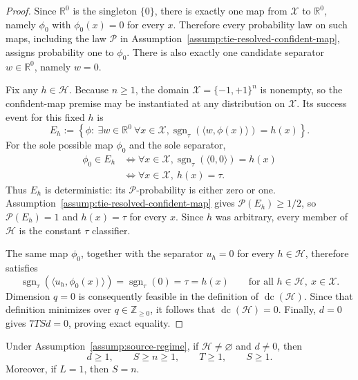 \begin{proof}
Since $\mathbb R^0$ is the singleton $\{0\}$, there is exactly one map
from $\mathcal X$ to $\mathbb R^0$, namely $\phi_0$ with
$\phi_0(x)=0$ for every $x$.  Therefore every probability law on such maps,
including the law $\mathcal P$ in Assumption~\ref{assump:tie-resolved-confident-map},
assigns probability one to $\phi_0$.  There is also exactly one candidate
separator $w\in\mathbb R^0$, namely $w=0$.

Fix any $h\in\mathcal H$.  Because $n\geq 1$, the domain
$\mathcal X=\{-1,+1\}^n$ is nonempty, so the confident-map premise may be
instantiated at any distribution on $\mathcal X$.  Its success event for this
fixed $h$ is
\[
E_h:=\left\{\phi:\ \exists w\in\mathbb R^0\ \forall x\in\mathcal X,
\operatorname{sgn}_{\tau}(\langle w,\phi(x)\rangle)=h(x)\right\}.
\]
For the sole possible map $\phi_0$ and the sole separator,
\[
\begin{aligned}
\phi_0\in E_h
&\iff \forall x\in\mathcal X,
\operatorname{sgn}_{\tau}(\langle 0,0\rangle)=h(x)\\
&\iff \forall x\in\mathcal X,\ h(x)=\tau.
\end{aligned}
\]
Thus $E_h$ is deterministic: its $\mathcal P$-probability is either zero
or one.  Assumption~\ref{assump:tie-resolved-confident-map} gives
$\mathcal P(E_h)\geq 1/2$, so $\mathcal P(E_h)=1$ and
$h(x)=\tau$ for every $x$.  Since $h$ was arbitrary, every member of
$\mathcal H$ is the constant $\tau$ classifier.

The same map $\phi_0$, together with the separator $u_h=0$ for every
$h\in\mathcal H$, therefore satisfies
\[
\operatorname{sgn}_{\tau}(\langle u_h,\phi_0(x)\rangle)
=\operatorname{sgn}_{\tau}(0)=\tau=h(x)
\qquad\text{for all }h\in\mathcal H,\ x\in\mathcal X.
\]
Dimension $q=0$ is consequently feasible in the definition of
$\operatorname{dc}(\mathcal H)$.  Since that definition minimizes over
$q\in\mathbb Z_{\geq 0}$, it follows that $\operatorname{dc}(\mathcal H)=0$.
Finally, $d=0$ gives $7TSd=0$, proving exact equality.
\end{proof}

\begin{proposition}
\label{prop:step-001-architecture}
Under Assumption~\ref{assump:source-regime}, if
$\mathcal H\neq\varnothing$ and $d\neq 0$, then
\[
d\geq 1,\qquad S\geq n\geq 1,\qquad T\geq 1,\qquad S\geq 1.
\]
Moreover, if $L=1$, then $S=n$.
\end{proposition}

